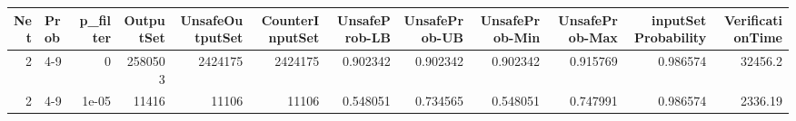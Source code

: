 \begin{tabular}{rlrrrrrrrrrr}
\hline
   Net & Prob   &   p\_filter &   OutputSet &   UnsafeOutputSet &   CounterInputSet &   UnsafeProb-LB &   UnsafeProb-UB &   UnsafeProb-Min &   UnsafeProb-Max &   inputSet Probability &   VerificationTime \\
\hline
     2 & 4-9    &      0     &     2580503 &           2424175 &           2424175 &        0.902342 &        0.902342 &         0.902342 &         0.915769 &               0.986574 &           32456.2  \\
     2 & 4-9    &      1e-05 &       11416 &             11106 &             11106 &        0.548051 &        0.734565 &         0.548051 &         0.747991 &               0.986574 &            2336.19 \\
\hline
\end{tabular}
